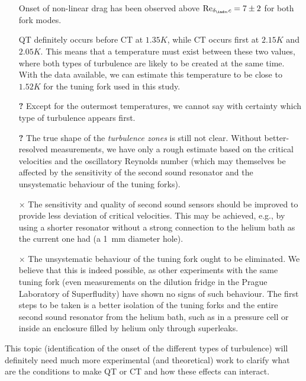 \begin{itemize}
	\item[\checkmark] Onset of non-linear drag has been observed above $ \text{Re}_{\delta_{\ind n}c}=7\pm 2 $ for both fork modes.
	
	\item[\checkmark] QT definitely occurs before CT at $ 1.35\unit{K} $, while CT occurs first at $ 2.15\unit{K} $ and $ 2.05\unit{K} $. This means that a temperature must exist between these two values, where both types of turbulence are likely to be created at the same time. With the data available, we can estimate this temperature to be close to $ 1.52\unit{K} $ for the tuning fork used in this study.
	
	\item[\textbf{?}] Except for the outermost temperatures, we cannot say with certainty which type of turbulence appears first.

	\item[\textbf{?}] The true shape of the \textit{turbulence zones} is still not clear. Without better-resolved measurements, we have only a rough estimate based on the critical velocities and the oscillatory Reynolds number (which may themselves be affected by the sensitivity of the second sound resonator and the unsystematic behaviour of the tuning forks).
	
	\item[$\times$] The sensitivity and quality of second sound sensors should be improved to provide less deviation of critical velocities. This may be achieved, e.g., by using a shorter resonator without a strong connection to the helium bath as the current one had (a 1~mm diameter hole).
	
	\item[$ \times $] The unsystematic behaviour of the tuning fork ought to be eliminated. We believe that this is indeed possible, as other experiments with the same tuning fork (even measurements on the dilution fridge in the Prague Laboratory of Superfludity) have shown no signs of such behaviour. The first steps to be taken is a better isolation of the tuning forks and the entire second sound resonator from the helium bath, such as in a pressure cell or inside an enclosure filled by helium only through superleaks.
\end{itemize}

This topic (identification of the onset of the different types of turbulence) will definitely need much more experimental (and theoretical) work to clarify what are the conditions to make QT or CT and how these effects can interact.